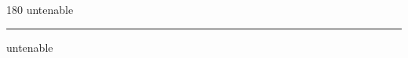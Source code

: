 
\begin{frame}
\begin{center}
\begin{turn}{180}
{\fontsize{2.5cm}{1em}\selectfont untenable}
\end{turn}
\vspace{1em}\par  
\hrule
\vspace{1em}\par  
{\fontsize{2.5cm}{1em}\selectfont untenable}
\end{center}
\end{frame}
